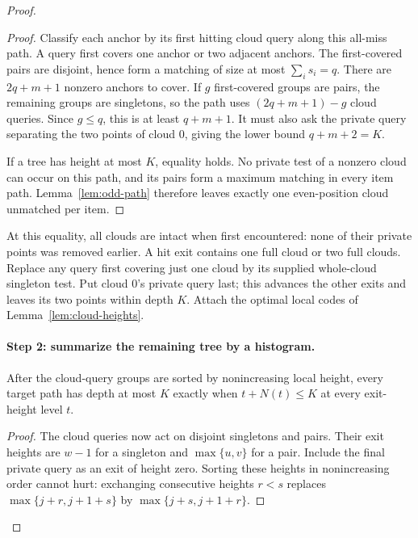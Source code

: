 \begin{proof}
\begin{proof}
Classify each anchor by its first hitting cloud query along this
all-miss path. A query first covers one anchor or two adjacent
anchors. The first-covered pairs are disjoint, hence form a
matching of size at most $\sum_i s_i=q$.
There are $2q+m+1$ nonzero anchors to cover. If $g$ first-covered
groups are pairs, the remaining groups are singletons, so the path
uses $(2q+m+1)-g$ cloud queries. Since $g\le q$, this is at least
$q+m+1$. It must also ask the private query separating the two
points of cloud $0$, giving the lower bound
$q+m+2=K$.

If a tree has height at most $K$, equality holds. No private test
of a nonzero cloud can occur on this path, and its pairs form a
maximum matching in every item path. Lemma~\ref{lem:odd-path}
therefore leaves exactly one even-position cloud unmatched per item.
\end{proof}

At this equality, all clouds are intact when first encountered:
none of their private points was removed earlier. A hit exit
contains one full cloud or two full clouds.
Replace any query first covering just one cloud by its supplied
whole-cloud singleton test. Put cloud $0$'s private query last;
this advances the other exits and leaves its two points within
depth $K$. Attach the optimal local codes of
Lemma~\ref{lem:cloud-heights}.

\paragraph{Step 2: summarize the remaining tree by a histogram.}
\begin{claim}
After the cloud-query groups are sorted by nonincreasing local
height, every target path has depth at most $K$ exactly when
$t+N(t)\le K$ at every exit-height level $t$.
\end{claim}
\begin{proof}
The cloud queries now act on disjoint singletons and pairs.
Their exit heights are $w-1$ for a singleton and $\max\{u,v\}$
for a pair. Include the final private query as an exit of height
zero. Sorting these heights in nonincreasing order cannot hurt:
exchanging consecutive heights $r<s$ replaces
$\max\{j+r,j+1+s\}$ by $\max\{j+s,j+1+r\}$.


\end{proof}
\end{proof}
